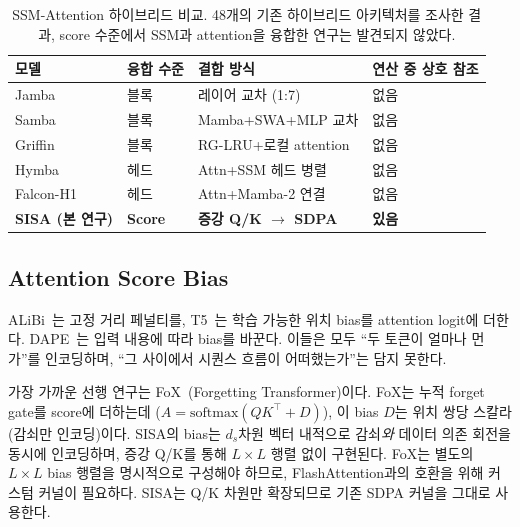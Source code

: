 \documentclass[11pt]{article}
\begin{document}
\begin{table}[h]
\centering\small
\caption{SSM-Attention 하이브리드 비교. 48개의 기존 하이브리드 아키텍처를 조사한 결과, score 수준에서 SSM과 attention을 융합한 연구는 발견되지 않았다.}
\label{tab:related}
\begin{tabular}{llll}
\toprule
\textbf{모델} & \textbf{융합 수준} & \textbf{결합 방식} & \textbf{연산 중 상호 참조} \\
\midrule
Jamba~\citep{jamba} & 블록 & 레이어 교차 (1:7) & 없음 \\
Samba~\citep{samba} & 블록 & Mamba+SWA+MLP 교차 & 없음 \\
Griffin~\citep{griffin} & 블록 & RG-LRU+로컬 attention & 없음 \\
Hymba~\citep{hymba} & 헤드 & Attn+SSM 헤드 병렬 & 없음 \\
Falcon-H1~\citep{falconh1} & 헤드 & Attn+Mamba-2 연결 & 없음 \\
\midrule
\textbf{SISA (본 연구)} & \textbf{Score} & \textbf{증강 Q/K $\to$ SDPA} & \textbf{있음} \\
\bottomrule
\end{tabular}
\end{table}

\subsection{Attention Score Bias}

ALiBi~\citep{alibi}는 고정 거리 페널티를, T5~\citep{raffel2020t5}는 학습 가능한 위치 bias를 attention logit에 더한다. DAPE~\citep{dape}는 입력 내용에 따라 bias를 바꾼다. 이들은 모두 ``두 토큰이 얼마나 먼가''를 인코딩하며, ``그 사이에서 시퀀스 흐름이 어떠했는가''는 담지 못한다.

가장 가까운 선행 연구는 FoX~\citep{fox}(Forgetting Transformer)이다. FoX는 누적 forget gate를 score에 더하는데 ($A = \text{softmax}(QK^\top + D)$), 이 bias $D$는 위치 쌍당 스칼라(감쇠만 인코딩)이다. SISA의 bias는 $d_s$차원 벡터 내적으로 감쇠\emph{와} 데이터 의존 회전을 동시에 인코딩하며, 증강 Q/K를 통해 $L{\times}L$ 행렬 없이 구현된다. FoX는 별도의 $L{\times}L$ bias 행렬을 명시적으로 구성해야 하므로, FlashAttention과의 호환을 위해 커스텀 커널이 필요하다. SISA는 Q/K 차원만 확장되므로 기존 SDPA 커널을 그대로 사용한다.
\end{document}
